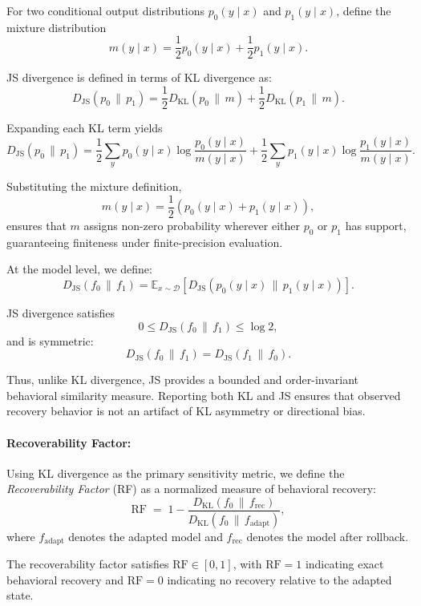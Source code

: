 \documentclass[10pt]{article}
\begin{document}
	For two conditional output distributions $p_0(y \mid x)$ and $p_1(y \mid x)$, define the mixture distribution
	\[
	m(y \mid x)
	=
	\frac{1}{2} p_0(y \mid x)
	+
	\frac{1}{2} p_1(y \mid x).
	\]
	
	JS divergence is defined in terms of KL divergence as:
	\[
	D_{\mathrm{JS}}(p_0 \,\|\, p_1)
	=
	\frac{1}{2}
	D_{\mathrm{KL}}\!\left(p_0 \,\|\, m\right)
	+
	\frac{1}{2}
	D_{\mathrm{KL}}\!\left(p_1 \,\|\, m\right).
	\]
	
	Expanding each KL term yields
	\[
	D_{\mathrm{JS}}(p_0 \,\|\, p_1)
	=
	\frac{1}{2}
	\sum_y
	p_0(y \mid x)
	\log
	\frac{p_0(y \mid x)}{m(y \mid x)}
	+
	\frac{1}{2}
	\sum_y
	p_1(y \mid x)
	\log
	\frac{p_1(y \mid x)}{m(y \mid x)}.
	\]
	
	Substituting the mixture definition,
	\[
	m(y \mid x)
	=
	\frac{1}{2}
	\left(
	p_0(y \mid x)
	+
	p_1(y \mid x)
	\right),
	\]
	ensures that $m$ assigns non-zero probability wherever either $p_0$ or $p_1$ has support, guaranteeing finiteness under finite-precision evaluation.
	
	At the model level, we define:
	\[
	D_{\mathrm{JS}}(f_0 \,\|\, f_1)
	=
	\mathbb{E}_{x \sim \mathcal{D}}
	\left[
	D_{\mathrm{JS}}
	\left(
	p_0(y \mid x)
	\,\|\, 
	p_1(y \mid x)
	\right)
	\right].
	\]
	
	JS divergence satisfies
	\[
	0 \le D_{\mathrm{JS}}(f_0 \,\|\, f_1) \le \log 2,
	\]
	and is symmetric:
	\[
	D_{\mathrm{JS}}(f_0 \,\|\, f_1)
	=
	D_{\mathrm{JS}}(f_1 \,\|\, f_0).
	\]
	
	Thus, unlike KL divergence, JS provides a bounded and order-invariant behavioral similarity measure. Reporting both KL and JS ensures that observed recovery behavior is not an artifact of KL asymmetry or directional bias.
	
	\paragraph{Recoverability Factor:}
	
	Using KL divergence as the primary sensitivity metric, we define the \emph{Recoverability Factor} (RF) as a normalized measure of behavioral recovery:
	\[
	\mathrm{RF}
	\;=\;
	1 - \frac{D_{\mathrm{KL}}(f_0 \,\|\, f_{\mathrm{rec}})}
	{D_{\mathrm{KL}}(f_0 \,\|\, f_{\mathrm{adapt}})},
	\]
	where $f_{\mathrm{adapt}}$ denotes the adapted model and $f_{\mathrm{rec}}$ denotes the model after rollback.
	
	The recoverability factor satisfies $\mathrm{RF} \in [0,1]$, with $\mathrm{RF} = 1$ indicating exact behavioral recovery and $\mathrm{RF} = 0$ indicating no recovery relative to the adapted state.
	
\end{document}
